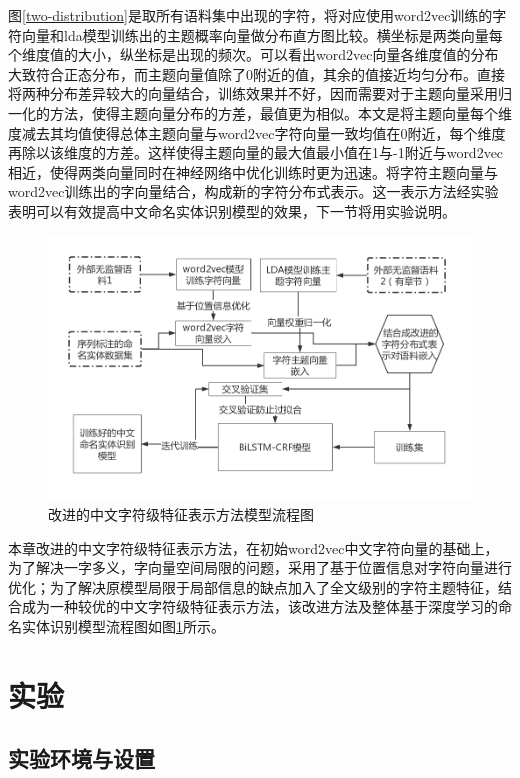\documentclass[winfonts,master,oneside,nobackinfo]{njuthesis}
\begin{document}
图\ref{two-distribution}是取所有语料集中出现的字符，将对应使用word2vec训练的字符向量和lda模型训练出的主题概率向量做分布直方图比较。横坐标是两类向量每个维度值的大小，纵坐标是出现的频次。可以看出word2vec向量各维度值的分布大致符合正态分布，而主题向量值除了0附近的值，其余的值接近均匀分布。直接将两种分布差异较大的向量结合，训练效果并不好，因而需要对于主题向量采用归一化的方法，使得主题向量分布的方差，最值更为相似。本文是将主题向量每个维度减去其均值使得总体主题向量与word2vec字符向量一致均值在0附近，每个维度再除以该维度的方差。这样使得主题向量的最大值最小值在1与-1附近与word2vec相近，使得两类向量同时在神经网络中优化训练时更为迅速。将字符主题向量与word2vec训练出的字向量结合，构成新的字符分布式表示。这一表示方法经实验表明可以有效提高中文命名实体识别模型的效果，下一节将用实验说明。

\begin{figure}[h]
\centering
\includegraphics[width=1\textwidth]{./figure/改进的字符分布式表示.jpg}
\caption{改进的中文字符级特征表示方法模型流程图}
\label{all-step}
\end{figure}

本章改进的中文字符级特征表示方法，在初始word2vec中文字符向量的基础上，为了解决一字多义，字向量空间局限的问题，采用了基于位置信息对字符向量进行优化；为了解决原模型局限于局部信息的缺点加入了全文级别的字符主题特征，结合成为一种较优的中文字符级特征表示方法，该改进方法及整体基于深度学习的命名实体识别模型流程图如图\ref{all-step}所示。



\section{实验}

\subsection{实验环境与设置}
\end{document}
